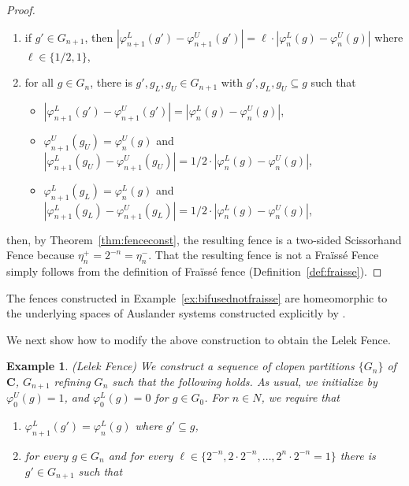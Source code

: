 \documentclass[11pt]{amsart}
\newtheorem{example}[theorem]{Example}
\newcommand{\cantor}{\mathbf C}
\begin{document}
{\begin{proof}
\begin{enumerate}[label=(\alph*)]
    \item if $g' \in G_{n+1}$, then $|\varphi_{n+1}^L(g') -\varphi_{n+1}^U(g')| = \ell \cdot |\varphi_{n}^L(g) -\varphi_{n}^U(g)|$ where $\ell \in \{1/2, 1 \}$,
\item for all $g \in G_n$, there is $g',g_L, g _U \in G_{n+1}$ with $g',g_L, g_U  \subseteq g$ such that 
    \begin{itemize}
        \item $|\varphi_{n+1}^L(g') -\varphi_{n+1}^U(g')| = |\varphi_{n}^L(g) -\varphi_{n}^U(g)|$,
        \item $\varphi^U_{n+1} (g_U) = \varphi^U_{n} (g) $ and  $|\varphi_{n+1}^L(g_U) -\varphi_{n+1}^U(g_U)| = 1/2 \cdot |\varphi_{n}^L(g) -\varphi_{n}^U(g)|$,
        \item $\varphi^L_{n+1} (g_L) = \varphi^L_{n} (g) $ and  $|\varphi_{n+1}^L(g_L) -\varphi_{n+1}^U(g_L)| = 1/2 \cdot |\varphi_{n}^L(g) -\varphi_{n}^U(g)|$,
    \end{itemize}
\end{enumerate}
 then, by Theorem~\ref{thm:fenceconst}, the resulting fence is a two-sided Scissorhand Fence because $\eta^+_{n}=2^{-n}=\eta^-_{n}$. That the resulting fence is not a Fra\"iss\'e Fence  simply follows from the definition of Fra\"iss\'e fence (Definition~\ref{def:fraisse}).
 \end{proof}


 The fences constructed in Example~\ref{ex:bifusednotfraisse} are homeomorphic to the underlying spaces of Auslander systems constructed explicitly by \cite{HaddadJohnson97}.

We next show how to modify the above construction to obtain the Lelek Fence.

\begin{example}\label{ex:LeLekFrA} (Lelek Fence) 
We construct a sequence of clopen partitions $\{G_n\}$ of $\cantor$,  $G_{n+1}$ refining $G_n$ such that  
the following holds. As usual, we initialize by $\varphi^U_0(g)=1$, and $\varphi^L_0 (g)=0$ for $g \in G_0$. For $n \in N$, we require that  
   \begin{enumerate}

  \item $\varphi^L_{n+1} (g')= \varphi^L_{n}(g)$ where $g' \subseteq g$, 
    \item for every $g\in G_n$ and for every $\ell \in \{2^{-n}, 2\cdot 2^{-n},\ldots, 2^n\cdot 2^{-n}=1\}$ there is $g' \in G_{n+1}$ such that 
    

\end{enumerate}
\end{example}}
\end{document}
